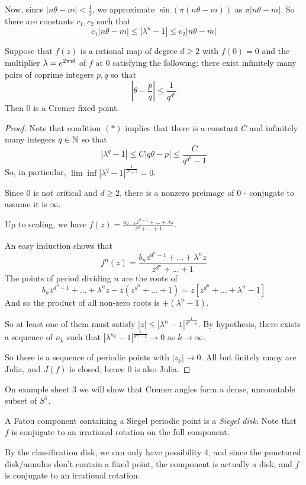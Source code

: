 \documentclass[10pt,a4paper]{article}
\begin{document}
Now, since $|n\theta - m| < \frac12$, we approximate $\sin(\pi(n\theta-m))$ as $\pi|n\theta-m|$.
So there are constants $c_1, c_2$ such that
\[c_1|n\theta - m| \leq |\lambda^n-1| \leq c_2|n\theta -m|\]
\begin{theorem}[Cremer]
  Suppose that $f(z)$ is a rational map of degree $d \geq 2$ with $f(0) = 0$ and the multiplier $\lambda = e^{2\pi\mathfrak{i}\theta}$ of $f$ at $0$ satisfying the following: there exist infinitely many pairs of coprime integers $p,q$ so that
  \[\left| \theta-\frac{p}{q}\right| \leq \frac{1}{q^{d^q}}\tag{$\ast$}\]
  Then $0$ is a Cremer fixed point.
\end{theorem}
\begin{proof}
  Note that condition $(\ast)$ implies that there is a constant $C$ and infinitely many integers $q \in \mathbb{N}$ so that
  \[|\lambda^q - 1| \leq C|q\theta-p| \leq \frac{C}{q^{d^q}-1}\]
  So, in particular, $\lim \inf |\lambda^q -1|^{\frac{1}{d^q-1}} = 0$.

  Since $0$ is not critical and $d \geq 2$, there is a nonzero preimage of $0$ - conjugate to assume it is $\infty$.

  Up to scaling, we have $f(z) = \frac{a_{d-1}z^{d-1} + \ldots + \lambda z}{z^d+\ldots+1}$.

  An easy induction shows that
  \[f^n(z) = \frac{b_nz^{d^n-1}+\ldots + \lambda^n z}{z^{d^n}+\ldots + 1}\]
  The points of period dividing $n$ are the roots of
  \[b_nz^{d^n-1}+ \ldots +\lambda^n z - z(z^{d^n}+\ldots+1) = z[z^{d^n}+\ldots +\lambda^n-1]\]
  And so the product of all non-zero roots is $\pm(\lambda^n-1)$.

  So at least one of them must satisfy $|z| \leq |\lambda^n-1|^{\frac{1}{d^n-1}}$. By hypothesis, there exists a sequence of $n_k$ such that $|\lambda^{n_k}-1|^{\frac{1}{d^{n_k}-1}}\to 0$ as $k \to \infty$.

  So there is a sequence of periodic points with $|z_k|\to 0$. All but finitely many are Julia, and $J(f)$ is closed, hence $0$ is also Julia.
\end{proof}
On example sheet 3 we will show that Cremer angles form a dense, uncountable subset of $S^1$.
\begin{definition}
  A Fatou component containing a Siegel periodic point is a \emph{Siegel disk}. Note that $f$ is conjugate to an irrational rotation on the full component.
\end{definition}
By the classification disk, we can only have possibility 4, and since the punctured disk/annulus don't contain a fixed point, the component is actually a disk, and $f$ is conjugate to an irrational rotation.
\end{document}
